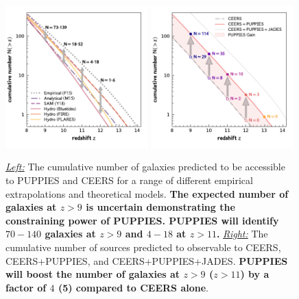 \documentclass[12pt]{article}
\begin{document}
\begin{figure}[h!]
    \centering
    \includegraphics[width=0.49\textwidth]{figs/CN_models.pdf}
    \includegraphics[width=0.49\textwidth]{figs/CN_surveys.pdf}
    \vspace{-5mm}
    \caption{\emph{\underline{Left:}} The cumulative number of galaxies predicted to be accessible to PUPPIES and CEERS for a range of different empirical extrapolations and theoretical models. \textbf{The expected number of galaxies at $z>9$ is uncertain demonstrating the constraining power of PUPPIES. PUPPIES will identify $70-140$ galaxies at $z>9$ and $4-18$ at $z>11$.} \emph{\underline{Right:}} The cumulative number of sources predicted to observable to CEERS, CEERS+PUPPIES, and CEERS+PUPPIES+JADES. \textbf{PUPPIES will boost the number of galaxies at $z>9$ ($z>11$) by a factor of $4$ (5) compared to CEERS alone}. }
    \label{fig:CN}
\end{figure}
\end{document}
